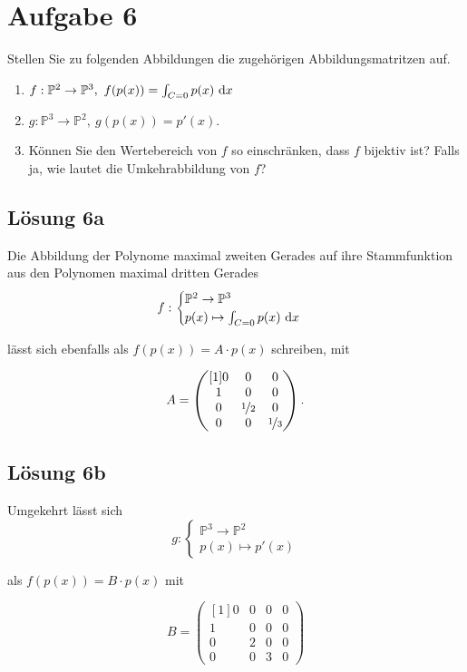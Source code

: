 \documentclass[main.tex]{subfiles}
\begin{document}
\section{Aufgabe 6}
Stellen Sie zu folgenden Abbildungen die zugehörigen Abbildungsmatritzen auf.

\begin{enumerate}
    \item $f: \mathbb{P}^2 \to \mathbb{P}^3, \ f(p(x)) = \int_{C=0} p(x) \dx$
    \item $g: \mathbb{P}^3 \to \mathbb{P}^2, \ g(p(x)) = p'(x).$
    \item Können Sie den Wertebereich von $f$ so einschränken, dass $f$ bijektiv ist? Falls ja, wie lautet die Umkehrabbildung von $f$?
\end{enumerate}

\subsection{Lösung 6a}
Die Abbildung der Polynome maximal zweiten Gerades auf ihre Stammfunktion aus den Polynomen maximal dritten Gerades
$$
    f : \begin{cases}
        \mathbb{P}^2 \to \mathbb{P}^3\\
        p(x) \mapsto \int_{C=0} p(x) ~\mathrm{d}x
    \end{cases}
$$

lässt sich ebenfalls als $f(p(x)) = A\cdot p(x)$ schreiben, mit

$$
    A = \begin{pmatrix}[1]
        0 & 0 & 0 \\
        1 & 0 & 0 \\
        0 & \nicefrac{1}{2} & 0 \\
        0 & 0 & \nicefrac{1}{3}
    \end{pmatrix}.
$$

\subsection{Lösung 6b}
Umgekehrt lässt sich
$$
    g : \begin{cases}
        \mathbb{P}^3 \to \mathbb{P}^2\\
        p(x) \mapsto p'(x)
    \end{cases}
$$

als $f(p(x)) = B\cdot p(x)$ mit

$$
    B = \begin{pmatrix}[1]
        0 & 0 & 0 & 0 \\
        1 & 0 & 0 & 0 \\
        0 & 2 & 0 & 0 \\
        0 & 0 & 3 & 0
    \end{pmatrix}
$$
\end{document}
